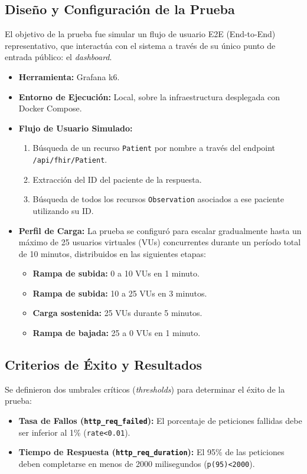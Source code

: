 \subsection{Diseño y Configuración de la Prueba}
El objetivo de la prueba fue simular un flujo de usuario E2E (End-to-End) representativo, que interactúa con el sistema a través de su único punto de entrada público: el \textit{dashboard}.

\begin{itemize}
    \item \textbf{Herramienta:} Grafana k6.
    \item \textbf{Entorno de Ejecución:} Local, sobre la infraestructura desplegada con Docker Compose.
    \item \textbf{Flujo de Usuario Simulado:}
    \begin{enumerate}
        \item Búsqueda de un recurso \texttt{Patient} por nombre a través del endpoint \texttt{/api/fhir/Patient}.
        \item Extracción del ID del paciente de la respuesta.
        \item Búsqueda de todos los recursos \texttt{Observation} asociados a ese paciente utilizando su ID.
    \end{enumerate}
    \item \textbf{Perfil de Carga:} La prueba se configuró para escalar gradualmente hasta un máximo de 25 usuarios virtuales (VUs) concurrentes durante un período total de 10 minutos, distribuidos en las siguientes etapas:
    \begin{itemize}
        \item \textbf{Rampa de subida:} 0 a 10 VUs en 1 minuto.
        \item \textbf{Rampa de subida:} 10 a 25 VUs en 3 minutos.
        \item \textbf{Carga sostenida:} 25 VUs durante 5 minutos.
        \item \textbf{Rampa de bajada:} 25 a 0 VUs en 1 minuto.
    \end{itemize}
\end{itemize}

\subsection{Criterios de Éxito y Resultados}
Se definieron dos umbrales críticos (\textit{thresholds}) para determinar el éxito de la prueba:
\begin{itemize}
    \item \textbf{Tasa de Fallos (\texttt{http\_req\_failed}):} El porcentaje de peticiones fallidas debe ser inferior al 1\% (\texttt{rate<0.01}).
    \item \textbf{Tiempo de Respuesta (\texttt{http\_req\_duration}):} El 95\% de las peticiones deben completarse en menos de 2000 milisegundos (\texttt{p(95)<2000}).
\end{itemize}

